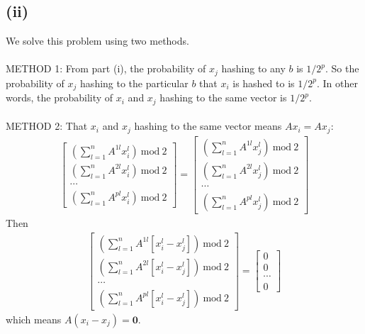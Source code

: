 \documentclass[]{homework}
\begin{document}
\subsection*{(ii)}
We solve this problem using two methods.
\\\\
METHOD 1:
From part (i), the probability of $x_j$ hashing to any $b$ is $1/2^p$.
So the probability of $x_j$ hashing to the particular $b$ that $x_i$ is hashed to is $1/2^p$.
In other words, the probability of $x_i$ and $x_j$ hashing to the same vector is $1/2^p$.
\\\\
METHOD 2:
That $x_i$ and $x_j$ hashing to the same vector means $A x_i = A x_j$:
%
\begin{equation}
\begin{split}
\left[\begin{matrix} (\sum\limits_{l=1}^n A^{1l} x_i^l)\ \mathrm{mod}\ 2\\ (\sum\limits_{l=1}^n A^{2l} x_i^l)\ \mathrm{mod}\ 2\\ \cdots \\ (\sum\limits_{l=1}^n A^{pl} x_i^l)\ \mathrm{mod}\ 2 \end{matrix} \right]
= \left[\begin{matrix} (\sum\limits_{l=1}^n A^{1l} x_j^l)\ \mathrm{mod}\ 2\\ (\sum\limits_{l=1}^n A^{2l} x_j^l)\ \mathrm{mod}\ 2\\ \cdots \\ (\sum\limits_{l=1}^n A^{pl} x_j^l)\ \mathrm{mod}\ 2 \end{matrix} \right]
\end{split}
\end{equation}
%
Then
%
\begin{equation}
\begin{split}
\left[\begin{matrix} (\sum\limits_{l=1}^n A^{1l} [x_i^l  - x_j^l])\ \mathrm{mod}\ 2\\ (\sum\limits_{l=1}^n A^{2l} [x_i^l  - x_j^l])\ \mathrm{mod}\ 2\\ \cdots \\ (\sum\limits_{l=1}^n A^{pl} [x_i^l  - x_j^l])\ \mathrm{mod}\ 2 \end{matrix} \right]
= \left[\begin{matrix} 0\\ 0\\ \cdots \\0\end{matrix} \right]
\end{split}
\end{equation}
%
which means $A(x_i - x_j) = \mathbf{0}$.
\end{document}
